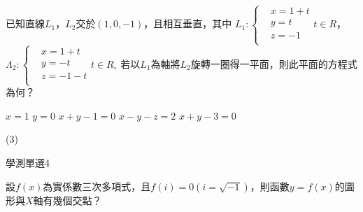 \begin{QUESTIONS}
\begin{QUESTION}
\begin{ExamAnsRateInfo}{}{}{}{}
        \end{ExamAnsRateInfo}
        \begin{QBODY}
            已知直線${{L}_{1}}$，${{L}_{2}}$交於$\left( 1,0,-1 \right)$，且相互垂直，其中
            ${{L}_{1}}:\left\{ \begin{aligned}
            & x=1+t \\ 
            & y=t \\ 
            & z=-1 \\ 
            \end{aligned} \right.t\in R$，	${{\Lambda }_{2}}:\left\{ \begin{aligned}
            & x =1+t  \\ 
            & y =-t  \\ 
            & z =-1-t  \\ 
            \end{aligned} \right.t \in R {{}_{\circ }}$
            若以${{L}_{1}}$為軸將${{L}_{2}}$旋轉一圈得一平面，則此平面的方程式為何？
            \begin{QOPS} 
                \QOP $x=1$	
                \QOP $y=0$	
                \QOP $x+y-1=0$
                \QOP $x-y-z=2$	
                \QOP $x+y-3=0$
            \end{QOPS}
        \end{QBODY}
        \begin{QFROMS}
        \end{QFROMS}
        \begin{QTAGS}\end{QTAGS}
        \begin{QANS}
            (3)
        \end{QANS}
        \begin{QSOLLIST}
        \end{QSOLLIST}
        \begin{QEMPTYSPACE}
        \end{QEMPTYSPACE}
    \end{QUESTION}
    \begin{QUESTION}
        \begin{ExamInfo}{85}{學測}{單選}{4}
        \end{ExamInfo}
        \begin{ExamAnsRateInfo}{}{}{}{}
        \end{ExamAnsRateInfo}
        \begin{QBODY}
            設$f\left( x \right)$為實係數三次多項式，且$f\left( i \right)=0\left( i=\sqrt{-1} \right)$，則函數$y=f\left( x \right)$的圖形與$X$軸有幾個交點？

\end{QBODY}
\end{QUESTION}
\end{QUESTIONS}
